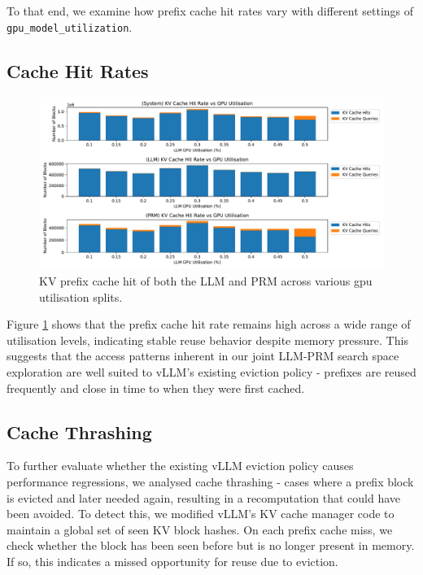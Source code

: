 \documentclass[11pt,twoside]{report}
\begin{document}
To that end, we examine how prefix cache hit rates vary with different settings of \texttt{gpu\_model\_utilization}.

\subsection{Cache Hit Rates}
\begin{figure}[htbp]
\centering
\includegraphics[width=\textwidth]{figures/kv_cache_hit_rate.pdf}
\caption{KV prefix cache hit of both the LLM and PRM across various gpu utilisation splits.}
\label{fig:kv_cache_hit_rate}
\end{figure}

Figure \ref{fig:kv_cache_hit_rate} shows that the prefix cache hit rate remains high across a wide range of utilisation levels, indicating stable reuse behavior despite memory pressure. 
This suggests that the access patterns inherent in our joint LLM-PRM search space exploration are well suited to vLLM's existing eviction policy - prefixes are reused frequently and close in time to when they were first cached.

\subsection{Cache Thrashing}
To further evaluate whether the existing vLLM eviction policy causes performance regressions, we analysed cache thrashing - cases where a prefix block is evicted and later needed again, resulting in a recomputation that could have been avoided. 
To detect this, we modified vLLM's KV cache manager code to maintain a global set of seen KV block hashes. 
On each prefix cache miss, we check whether the block has been seen before but is no longer present in memory. 
If so, this indicates a missed opportunity for reuse due to eviction.
\end{document}
